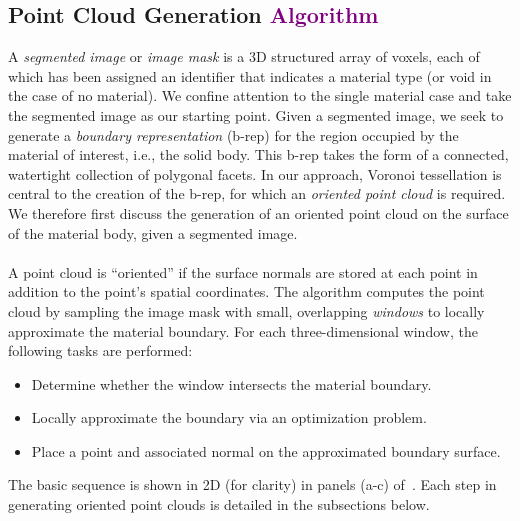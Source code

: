 \subsection{Point Cloud Generation \textcolor{purple}{Algorithm}}
\label{Point Cloud Generation}

A \textit{segmented image} or \textit{image mask} is a 3D structured array of voxels, each of which has been assigned an identifier that indicates a material type (or void in the case of no material). We confine attention to the single material case and take the segmented image as our starting point.  Given a segmented image, we seek to generate a {\em boundary representation} (b-rep) for the region occupied by the material of interest, i.e., the solid body.  This b-rep takes the form of a connected, watertight collection of polygonal facets.  In our approach, Voronoi tessellation is central to the creation of the b-rep, for which an {\em oriented point cloud} is required.  We therefore first discuss the generation of an oriented point cloud on the surface of the material body, given a segmented image. \\ \\
%
A point cloud is ``oriented'' if the surface normals are stored at each point in addition to the point's spatial coordinates. The algorithm computes the point cloud by sampling the image mask with small, overlapping \textit{windows} to locally approximate the material boundary. For each three-dimensional window, the following tasks are performed:
\vspace{2mm}
\begin{itemize}[noitemsep]
  \item Determine whether the window intersects the material boundary.
  \item Locally approximate the boundary via an optimization problem. 
  \item Place a point and associated normal on the approximated boundary surface.
\end{itemize}
\vspace{2mm}
The basic sequence is shown in 2D (for clarity) in panels (a-c) of~. Each step in generating oriented point clouds is detailed in the subsections below.

